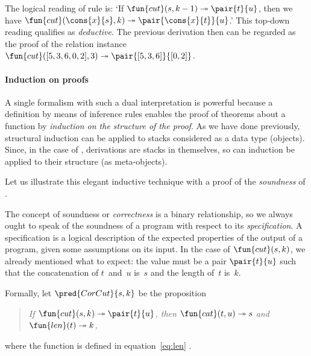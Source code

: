 The logical reading of rule  is: `If \(\fun{cut}(s,k-1)
\twoheadrightarrow \pair{t}{u}\), then we have
\(\fun{cut}(\cons{x}{s},k) \twoheadrightarrow
\pair{\cons{x}{t}}{u}\).'  This top\hyp{}down reading qualifies as
\emph{deductive}. The
previous derivation then can be regarded as the proof of the relation
instance \(\fun{cut}([5,3,6,0,2],3) \twoheadrightarrow
\pair{[5,3,6]}{[0,2]}\).


\paragraph{Induction on proofs}

A single formalism with such a dual interpretation is powerful because
a definition by means of inference rules enables the proof of theorems
about a function by \emph{induction on the structure of the proof}. As
we have done previously, structural induction can be applied to stacks
considered as a data type (objects). Since, in the case of
, derivations are stacks in themselves, so can induction be
applied to their structure (as meta\hyp{}objects).

Let us illustrate this elegant inductive technique with a proof of the
\emph{soundness} of
.

\label{par:cut_sound}

The concept of soundness or \emph{correctness} \citep{McCarthy_1962,
  Floyd_1967, Hoare_1971,
  Dijkstra_1976} is a binary
relationship, so we always ought to speak of the soundness of a
program with respect to its
\emph{specification}. A specification is a
logical description of the expected properties of the output of a
program, given some assumptions on its input. In the case of
\(\fun{cut}(s,k)\), we already mentioned what to expect: the value
must be a pair \(\pair{t}{u}\) such that the concatenation of
\(t\)~and~\(u\) is~\(s\) and the length of~\(t\) is~\(k\).

Formally, let \(\pred{CorCut}{s,k}\)
be the proposition
\begin{quote}
  \textsl{If \(\fun{cut}(s,k) \twoheadrightarrow \pair{t}{u}\), then
    \(\fun{cat}(t,u) \twoheadrightarrow s\) and \(\fun{len}(t)
    \twoheadrightarrow k\),}
\end{quote}
where the function  is defined in
equation~\eqref{eq:len} .

